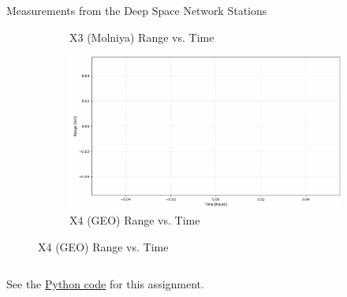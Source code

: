 \begin{hwkProblem}{4}{Measurements from the Deep Space Network Stations}
\begin{figure}[H]
\begin{center}
\begin{subfigure}{0.4\textwidth}
				\caption{X3 (Molniya) Range vs. Time}
			\end{subfigure}
			\begin{subfigure}{0.4\textwidth} \label{fig:s04b4}
				\includegraphics[width=\linewidth]{./outputs/figures/s04b4.png}
				\caption{X4 (GEO) Range vs. Time}
			\end{subfigure}
		\end{center}
	\end{figure}

	\hwkPart{} \label{hwk:s04c}

	\inputminted{python}{./outputs/text/s04c.txt}

	\hwkCode{} \label{code:s04}

	See the \href{https://www.github.com/vaisriv/enae441-hw02/blob/main/src/hw02.py}{Python code} for this assignment.

\end{hwkProblem}


